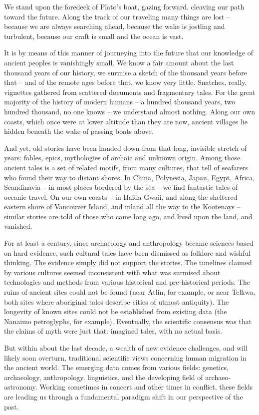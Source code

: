 \documentclass[letterpaper,10pt,headsepline]{scrreprt}
\begin{document}
We stand upon the foredeck of Plato's boat, gazing forward, cleaving
our path toward the future. Along the track of our traveling many
things are lost -- because we are always searching ahead, because the
wake is jostling and turbulent, because our craft is small and the
ocean is vast.

It is by means of this manner of journeying into the future that our
knowledge of ancient peoples is vanishingly small. We know a fair
amount about the last thousand years of our history, we surmise a
sketch of the thousand years before that -- and of the remote ages
before that, we know very little. Snatches, really, vignettes gathered
from scattered documents and fragmentary tales. For the great majority
of the history of modern humans -- a hundred thousand years, two
hundred thousand, no one knows -- we understand almost nothing. Along
our own coasts, which once were at lower altitude than they are now,
ancient villages lie hidden beneath the wake of passing boats above.

And yet, old stories have been handed down from that long, invisible
stretch of years: fables, epics, mythologies of archaic and unknown
origin. Among those ancient tales is a set of related motifs, from
many cultures, that tell of seafarers who found their way to distant
shores. In China, Polynesia, Japan, Egypt, Africa, Scandinavia -- in
most places bordered by the sea -- we find fantastic tales of oceanic
travel. On our own coasts -- in Haida Gwaii, and along the sheltered
eastern shore of Vancouver Island, and inland all the way to the
Kootenays -- similar stories are told of those who came long ago, and
lived upon the land, and vanished.

For at least a century, since archaeology and anthropology became
sciences based on hard evidence, such cultural tales have been
dismissed as folklore and wishful thinking. The evidence simply did
not support the stories. The timelines claimed by various cultures
seemed inconsistent with what was surmised about technologies and
methods from various historical and pre-historical periods. The ruins
of ancient sites could not be found (near Atlin, for example, or near
Telkwa, both sites where aboriginal tales describe cities of utmost
antiquity). The longevity of known sites could not be established from
existing data (the Nanaimo petroglyphs, for example). Eventually, the
scientific consensus was that the claims of myth were just that:
imagined tales, with no actual basis.

But within about the last decade, a wealth of new evidence challenges,
and will likely soon overturn, traditional scientific views concerning
human migration in the ancient world. The emerging data comes from
various fields: genetics, archaeology, anthropology, linguistics, and
the developing field of archaeo-astronomy. Working sometimes in
concert and other times in conflict, these fields are leading us
through a fundamental paradigm shift in our perspective of the past.
\end{document}
